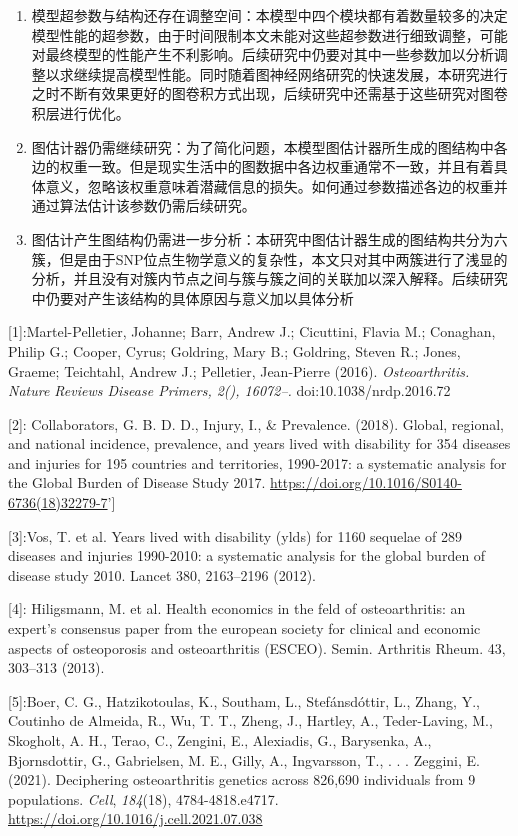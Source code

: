 \documentclass[
]{article}
\begin{document}
\begin{enumerate}
\def\labelenumi{\arabic{enumi}.}
\item
  模型超参数与结构还存在调整空间：本模型中四个模块都有着数量较多的决定模型性能的超参数，由于时间限制本文未能对这些超参数进行细致调整，可能对最终模型的性能产生不利影响。后续研究中仍要对其中一些参数加以分析调整以求继续提高模型性能。同时随着图神经网络研究的快速发展，本研究进行之时不断有效果更好的图卷积方式出现，后续研究中还需基于这些研究对图卷积层进行优化。
\item
  图估计器仍需继续研究：为了简化问题，本模型图估计器所生成的图结构中各边的权重一致。但是现实生活中的图数据中各边权重通常不一致，并且有着具体意义，忽略该权重意味着潜藏信息的损失。如何通过参数描述各边的权重并通过算法估计该参数仍需后续研究。
\item
  图估计产生图结构仍需进一步分析：本研究中图估计器生成的图结构共分为六簇，但是由于SNP位点生物学意义的复杂性，本文只对其中两簇进行了浅显的分析，并且没有对簇内节点之间与簇与簇之间的关联加以深入解释。后续研究中仍要对产生该结构的具体原因与意义加以具体分析
\end{enumerate}

{[}1{]}:Martel-Pelletier, Johanne; Barr, Andrew J.; Cicuttini, Flavia
M.; Conaghan, Philip G.; Cooper, Cyrus; Goldring, Mary B.; Goldring,
Steven R.; Jones, Graeme; Teichtahl, Andrew J.; Pelletier, Jean-Pierre
(2016). \emph{Osteoarthritis. Nature Reviews Disease Primers, 2(),
16072--.} doi:10.1038/nrdp.2016.72

{[}2{]}: Collaborators, G. B. D. D., Injury, I., \& Prevalence. (2018).
Global, regional, and national incidence, prevalence, and years lived
with disability for 354 diseases and injuries for 195 countries and
territories, 1990-2017: a systematic analysis for the Global Burden of
Disease Study 2017.
\url{https://doi.org/10.1016/S0140-6736(18)32279-7}'{]}

{[}3{]}:Vos, T. et al. Years lived with disability (ylds) for 1160
sequelae of 289 diseases and injuries 1990-2010: a systematic analysis
for the global burden of disease study 2010. Lancet 380, 2163--2196
(2012).

{[}4{]}: Hiligsmann, M. et al. Health economics in the feld of
osteoarthritis: an expert's consensus paper from the european society
for clinical and economic aspects of osteoporosis and osteoarthritis
(ESCEO). Semin. Arthritis Rheum. 43, 303--313 (2013).

{[}5{]}:Boer, C. G., Hatzikotoulas, K., Southam, L., Stefánsdóttir, L.,
Zhang, Y., Coutinho de Almeida, R., Wu, T. T., Zheng, J., Hartley, A.,
Teder-Laving, M., Skogholt, A. H., Terao, C., Zengini, E., Alexiadis,
G., Barysenka, A., Bjornsdottir, G., Gabrielsen, M. E., Gilly, A.,
Ingvarsson, T., . . . Zeggini, E. (2021). Deciphering osteoarthritis
genetics across 826,690 individuals from 9 populations. \emph{Cell},
\emph{184}(18), 4784-4818.e4717.
\url{https://doi.org/10.1016/j.cell.2021.07.038}
\end{document}

